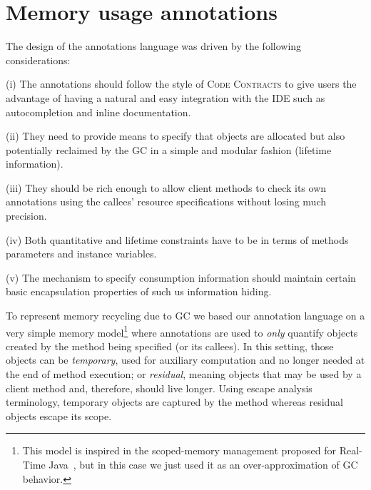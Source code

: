 \section{Memory usage annotations} \label{sec:annotations}
The design of the annotations language was driven by the following considerations: 
\begin{itemize*}
	\item[(i)] 
	 The annotations should follow the style of \textsc{Code Contracts} to  give users the advantage of having a natural and easy integration with the IDE such as autocompletion and inline documentation.
	\item[(ii)] They need to provide means to specify that objects are allocated but also potentially reclaimed by the GC in a simple and modular fashion (lifetime information). 
	\item[(iii)] They should be rich enough to allow client methods to check its own 
	annotations
	using the callees' resource specifications without losing much precision. 
	\item[(iv)] Both quantitative and lifetime constraints have to be in terms of methods parameters and instance variables.
	\item[(v)] The mechanism to specify consumption information should  maintain certain basic encapsulation properties of  such us information hiding.
\end{itemize*}

To represent memory recycling due to GC we based our annotation language on a very simple memory model\footnote{This model is inspired in the scoped-memory management proposed for Real-Time Java~\cite{bollella00realtime}, but in this case we just used it as an over-approximation of GC behavior.} 
where annotations are used to \emph{only} quantify  objects created by the method being specified (or its callees). 
In this setting, those objects can be \emph{temporary}, used for auxiliary computation and no longer needed at the end of method execution; or \emph{residual}, meaning objects that may be used by a client method and, therefore, should live longer.
Using escape analysis terminology, temporary objects are captured by the method whereas residual objects escape its scope.

